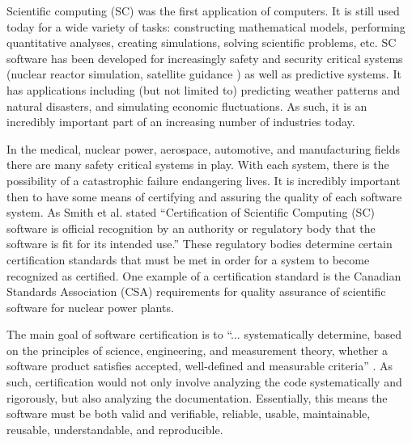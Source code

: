 \documentclass[10pt, preprint]{sigplanconf}
\begin{document}
	Scientific computing (SC) was the first application of computers. It is still used today for a wide variety of tasks: constructing mathematical models, performing quantitative analyses, creating simulations, solving scientific problems, etc. SC software has been developed for increasingly safety and security critical systems (nuclear reactor simulation, satellite guidance%
) as well as predictive systems. %
It has applications including (but not limited to) predicting weather patterns and natural disasters, and simulating economic fluctuations. As such, it is an incredibly important part of an increasing number of industries today.%

In the medical, nuclear power, aerospace, automotive, and manufacturing fields there are many safety critical systems in play. With each system, there is the possibility of a catastrophic failure endangering lives. It is incredibly important then to have some means of certifying and assuring the quality of each software system. As Smith et al. \cite{SmithKoothoorAndNedialkov2014} stated ``Certification of Scientiﬁc Computing (SC) software is official recognition by an authority or regulatory body that the software is ﬁt for its intended use.'' These regulatory bodies determine certain certification standards that must be met in order for a system to become recognized as certified. One example of a certification standard is the Canadian Standards Association (CSA) requirements for quality assurance of scientific software for nuclear power plants. 

The main goal of software certification is to ``... systematically determine, based on the principles of science, engineering, and measurement theory, whether a software product satisfies accepted, well-defined and measurable criteria'' \cite{HHLMWW}. As such, certification would not only involve analyzing the code systematically and rigorously, but also analyzing the documentation. Essentially, this means the software must be both valid and verifiable, reliable, usable, maintainable, reusable, understandable, and reproducible. %
\end{document}
